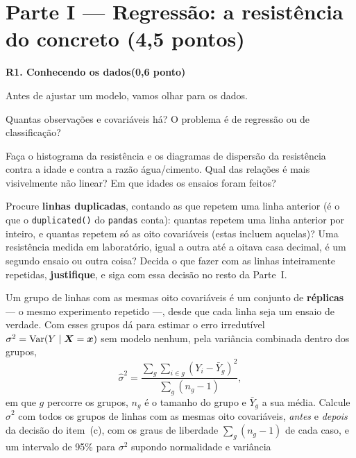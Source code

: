 \documentclass[11pt,a4paper]{article}
\newcommand{\tarefa}[3]{%
  \bigskip\par\noindent
  {\large\bfseries\color{azulufrj}#1. #2}\hfill{\bfseries(#3)}\par
  \nopagebreak\vspace{0.3em}}
\newcommand{\cod}[1]{\texttt{#1}}
\begin{document}
\section{Parte I --- Regressão: a resistência do concreto \hfill (4,5 pontos)}

\tarefa{R1}{Conhecendo os dados}{0,6 ponto}
Antes de ajustar um modelo, vamos olhar para os dados.

\begin{itens}
  \item Quantas observações e covariáveis há? O problema é de regressão ou de
        classificação?
  \item Faça o histograma da resistência e os diagramas de dispersão da resistência
        contra a idade e contra a razão água/cimento. Qual das relações é mais
        visivelmente não linear? Em que idades os ensaios foram feitos?
  \item Procure \textbf{linhas duplicadas}, contando as que repetem uma linha anterior
        (é o que o \cod{duplicated()} do \cod{pandas} conta): quantas repetem uma linha
        anterior por inteiro, e quantas repetem só as oito covariáveis (estas incluem
        aquelas)? Uma
        resistência medida em laboratório, igual a outra até a oitava casa decimal,
        é um segundo ensaio ou outra coisa? Decida o que fazer com as linhas
        inteiramente repetidas, \textbf{justifique}, e siga com essa decisão no resto
        da Parte~I.
  \item Um grupo de linhas com as mesmas oito covariáveis é um conjunto de
        \textbf{réplicas} --- o mesmo experimento repetido ---, desde que cada linha seja
        um ensaio de verdade. Com esses grupos dá para estimar o erro irredutível
        $\sigma^2=\operatorname{Var}(Y\mid\bm{X}=\bm{x})$ sem modelo nenhum, pela variância combinada dentro
        dos grupos,
        \[
          \widehat\sigma^2=\frac{\sum_g\sum_{i\in g}(Y_i-\bar Y_g)^2}{\sum_g(n_g-1)},
        \]
        em que $g$ percorre os grupos, $n_g$ é o tamanho do grupo e $\bar Y_g$ a sua
        média. Calcule $\widehat\sigma^2$ com todos os grupos de linhas com as mesmas
        oito covariáveis, \emph{antes} e \emph{depois} da decisão do item~(c), com os
        graus de liberdade $\sum_g(n_g-1)$ de cada caso, e
        um intervalo de 95\% para $\sigma^2$ supondo normalidade e variância

\end{itens}
\end{document}
